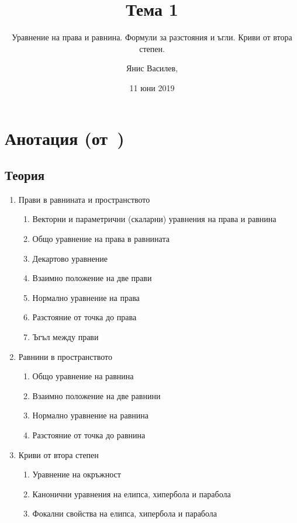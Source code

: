 \documentclass[numbers=endperiod, DIV=15]{scrartcl}
\title{Тема 1}
\subtitle{Уравнение на права и равнина. Формули за разстояния и ъгли. Криви от втора степен.}
\author{Янис Василев, \Email{ianis@ivasilev.net}}
\date{11 юни 2019}
\begin{document}
\maketitle

\section{Анотация (от~\cite{Syllabus})}

\subsection{Теория}

\begin{enumerate}
  \item Прави в равнината и пространството
  \begin{enumerate}
    \item Векторни и параметрични (скаларни) уравнения на права и равнина
    \item Общо уравнение на права в равнината
    \item Декартово уравнение
    \item Взаимно положение на две прави
    \item Нормално уравнение на права
    \item Разстояние от точка до права
    \item Ъгъл между прави
  \end{enumerate}

  \item Равнини в пространството
  \begin{enumerate}
    \item Общо уравнение на равнина
    \item Взаимно положение на две равнини
    \item Нормално уравнение на равнина
    \item Разстояние от точка до равнина
  \end{enumerate}

  \item Криви от втора степен
  \begin{enumerate}
    \item Уравнение на окръжност
    \item Канонични уравнения на елипса, хипербола и парабола
    \item Фокални свойства на елипса, хипербола и парабола
  \end{enumerate}
\end{enumerate}
\end{document}
